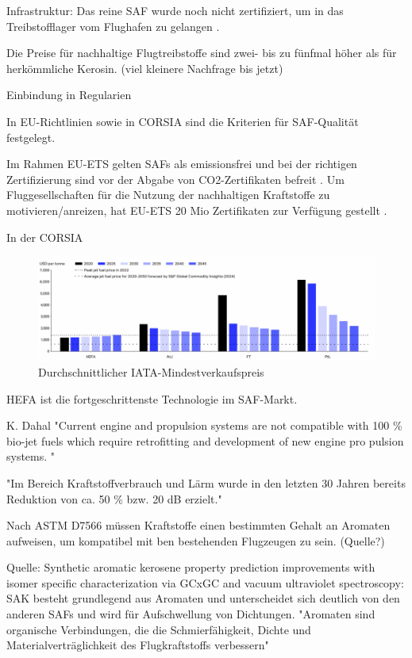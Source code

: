 Infrastruktur: Das reine SAF wurde noch nicht zertifiziert, um in das Treibstofflager vom Flughafen zu gelangen \cite{iata_saf_2024}.


Die Preise für nachhaltige Flugtreibstoffe sind zwei- bis zu fünfmal höher als für herkömmliche Kerosin. (viel kleinere Nachfrage bis jetzt)

Einbindung in Regularien

In EU-Richtlinien sowie in CORSIA sind die Kriterien für SAF-Qualität festgelegt.

Im Rahmen EU-ETS gelten SAFs als emissionsfrei und bei der richtigen Zertifizierung sind vor der Abgabe von CO2-Zertifikaten 
befreit \cite{icao_saf_conversion_2024}. Um Fluggesellschaften für die Nutzung der nachhaltigen Kraftstoffe zu motivieren/anreizen, hat EU-ETS
20 Mio Zertifikaten zur Verfügung gestellt \cite{icao_saf_conversion_2024}.

In der CORSIA 


\begin{figure}[h]
	\centering
	\includegraphics[width=0.4\linewidth]{Bilder/Preise SAF.png}
	\caption[Durchschnittlicher IATA-Mindestverkaufspreis (MSP) der wichtigsten SAF-Pfade über den Zeitraum 2020 bis 2050]{Durchschnittlicher IATA-Mindestverkaufspreis \cite{icao_saf_conversion_2024}}
	\label{fuelcell}
\end{figure}

HEFA ist die fortgeschrittenste Technologie im SAF-Markt.

K. Dahal "Current 
engine and propulsion systems are not compatible with 100 \% bio-jet 
fuels which require retrofitting and development of new engine pro
pulsion systems. "

\cite{mensen2013handbuch}  "Im Bereich Kraftstoffverbrauch und Lärm wurde in den letzten 30 Jahren bereits 
Reduktion von ca. 50 \% bzw. 20 dB erzielt."


Nach ASTM D7566 müssen Kraftstoffe einen bestimmten Gehalt an Aromaten aufweisen, um kompatibel mit ben bestehenden Flugzeugen zu sein. (Quelle?)

Quelle: Synthetic aromatic kerosene property prediction improvements with isomer specific characterization via GCxGC 
and vacuum ultraviolet spectroscopy: 
SAK besteht grundlegend aus Aromaten und unterscheidet sich deutlich von den anderen SAFs und wird für Aufschwellung von Dichtungen. 
"Aromaten sind organische Verbindungen, die die Schmierfähigkeit, Dichte und Materialverträglichkeit des Flugkraftstoffs verbessern"

